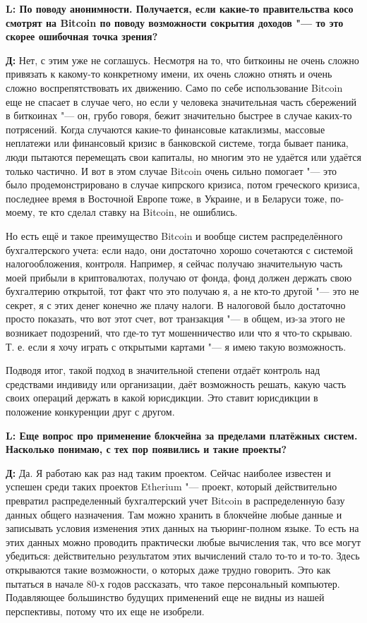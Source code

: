 \documentclass[10pt, a5paper]{article}
\begin{document}
{\noindent \bf L: По поводу анонимности. Получается, если какие-то правительства косо смотрят на Bitcoin по поводу возможности сокрытия доходов "--- то это скорее ошибочная точка зрения?}

{\noindent \bf Д:} Нет, с этим уже не соглашусь. Несмотря на то, что биткоины не очень сложно привязать к какому-то конкретному имени, их очень сложно отнять и очень сложно воспрепятствовать их движению. Само по себе использование Bitcoin еще не спасает в случае чего, но если у человека значительная часть сбережений в биткоинах "--- он, грубо говоря, бежит значительно быстрее в случае каких-то потрясений. Когда случаются какие-то финансовые катаклизмы, массовые неплатежи или финансовый кризис в банковской системе, тогда бывает паника, люди пытаются перемещать свои капиталы, но многим это не удаётся или удаётся только частично. И вот в этом случае Bitcoin очень сильно помогает "--- это было продемонстрировано в случае кипрского кризиса, потом греческого кризиса, последнее время в Восточной Европе тоже, в Украине, и в Беларуси тоже, по-моему, те кто сделал ставку на Bitcoin, не ошиблись. 

Но есть ещё и такое преимущество Bitcoin и вообще систем распределённого бухгалтерского учета: если надо, они достаточно хорошо сочетаются с системой налогообложения, контроля. Например, я сейчас получаю значительную часть моей прибыли в криптовалютах, получаю от фонда, фонд должен держать свою бухгалтерию открытой, тот факт что это получаю я, а не кто-то другой "--- это не секрет, я с этих денег конечно же плачу налоги. В налоговой было достаточно просто показать, что вот этот счет, вот транзакция "---  в общем, из-за этого не возникает подозрений, что где-то тут мошенничество или что я что-то скрываю. Т. е. если я хочу играть с открытыми картами "--- я имею такую возможность.

Подводя итог,  такой подход в значительной степени отдаёт контроль над средствами индивиду или организации, даёт возможность решать, какую часть своих операций держать в какой юрисдикции. Это ставит юрисдикции в положение конкуренции друг с другом.


{\noindent \bf L: Еще вопрос про применение блокчейна за пределами платёжных систем. Насколько понимаю, с тех пор появились и такие проекты?}

{\noindent \bf Д:} Да. Я работаю как раз над таким проектом. Сейчас наиболее известен и успешен среди таких проектов Etherium "--- проект, который действительно превратил распределенный бухгалтерский учет Bitcoin в распределенную базу данных общего назначения. Там можно хранить в блокчейне любые данные и записывать условия изменения этих данных на тьюринг-полном языке.
 То есть на этих данных можно проводить практически любые вычисления так, что все могут убедиться: действительно результатом этих вычислений стало то-то и то-то. Здесь открываются такие возможности, о которых даже трудно говорить. Это как пытаться в начале 80-х годов рассказать, что такое персональный компьютер. Подавляющее большинство будущих применений еще не видны из нашей перспективы, потому что их еще не изобрели.
\end{document}
